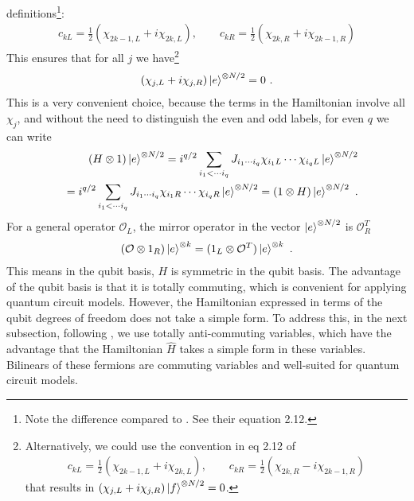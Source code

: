 \documentclass{article}
\theoremstyle{definition}
\newcommand{\nn}{\nonumber}
\newcommand{\mO}{\mathcal{O}}
\begin{document}
    definitions\footnote{Note the difference compared to \cite{gu2017spread}. See
    their equation 2.12.}:
    \begin{eqnarray}
        c_{kL}=\frac{1}{2}(\chi_{2k-1,L}+i \chi_{2k,L}),\qquad c_{kR}=\frac{1}{2}(\chi_{2k,R}+i\chi_{2k-1,R})
    \end{eqnarray}
    This ensures that for all $j$ we have\footnote{Alternatively, we could use the
    convention in eq 2.12 of \cite{gu2017spread}
    \begin{eqnarray}
        c_{kL}=\frac{1}{2}(\chi_{2k-1,L}+i \chi_{2k,L}),\qquad c_{kR}=\frac{1}{2}(\chi_{2k,R}-i\chi_{2k-1,R})
    \end{eqnarray}
    that results in $(\chi_{j,L}+i\chi_{j,R})\ket{f}^{\otimes N/2}=0$.}
    \begin{eqnarray}
        \label{evector} (\chi_{j,L}+i\chi_{j,R})\ket{e}^{\otimes N/2}=0\ .
    \end{eqnarray}
    This is a very convenient choice, because the terms in the Hamiltonian involve
    all $\chi_{j}$, and without the need to distinguish the even and odd labels,
    for even $q$ we can write
    \begin{eqnarray}
        &&(H\otimes 1)\ket{e}^{\otimes N/2}=i^{q/2}\sum_{i_1<\cdots i_q}J_{i_1\cdots i_q}\chi_{i_1L}\cdots
        \chi_{i_qL}\ket{e}^{\otimes N/2}\nn\\
        &&=i^{q/2}\sum_{i_1<\cdots i_q}J_{i_1\cdots i_q}\chi_{i_1R}\cdots \chi_{i_qR}\ket{e}^{\otimes N/2}=(1\otimes
        H)\ket{e}^{\otimes N/2}\ .
    \end{eqnarray}
    For a general operator $\mO_{L}$, the mirror operator in the vector
    $\ket{e}^{\otimes N/2}$ is $\mO^{T}_{R}$
    \begin{eqnarray}
        (\mO\otimes 1_R)\ket{e}^{\otimes k}=(1_L\otimes \mathcal{O}^T) \ket{e}^{\otimes k}\ .
    \end{eqnarray}
    This means in the qubit basis, $H$ is symmetric in the qubit basis. The
    advantage of the qubit basis is that it is totally commuting, which is convenient
    for applying quantum circuit models. However, the Hamiltonian expressed in terms
    of the qubit degrees of freedom does not take a simple form. To address this,
    in the next subsection, following \cite{gu2017spread}, we use totally anti-commuting
    variables, which have the advantage that the Hamiltonian $\hat{H}$ takes a
    simple form in these variables. Bilinears of these fermions are commuting variables
    and well-suited for quantum circuit models.
\end{document}

